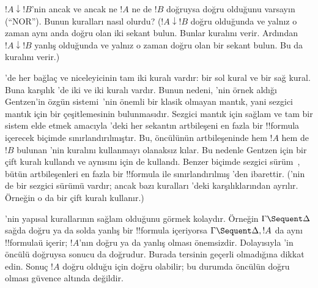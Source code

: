 \documentclass[../../../include/open-logic-section]{subfiles}
\begin{document}
\begin{prob}
$!A \downarrow !B$'nin ancak ve ancak ne $!A$ ne de $!B$ doğruysa doğru
olduğunu varsayın (``NOR''). Bunun  kuralları nasıl olurdu?
($!A \downarrow !B$ doğru olduğunda ve yalnız o zaman aynı anda doğru olan
iki sekant bulun. Bunlar \RightR{\downarrow} kuralını verir. Ardından $!A
\downarrow !B$ yanlış olduğunda ve yalnız o zaman doğru olan bir sekant
bulun. Bu da \LeftR{\downarrow} kuralını verir.)
\end{prob}

'de her bağlaç ve niceleyicinin tam iki kuralı vardır: bir sol
kural ve bir sağ kural. Buna karşılık 'de iki \LeftR{\land} ve
iki \RightR{\lor} kuralı vardır. Bunun nedeni, 'nin örnek aldığı
Gentzen'in özgün sistemi~'nin önemli bir klasik olmayan mantık,
yani sezgici mantık için bir  çeşitlemesinin bulunmasıdır. Sezgici
mantık için sağlam ve tam bir sistem elde etmek amacıyla 'deki her
sekantın artbileşeni en fazla bir !!{formula} içerecek biçimde
sınırlandırılmıştır. Bu, öncülünün artbileşeninde hem $!A$ hem de $!B$
bulunan 'nin \RightR{\lor} kuralını kullanmayı olanaksız kılar.
Bu nedenle Gentzen  için bir çift \RightR{\lor} kuralı kullandı ve
aynısını  için de kullandı. Benzer biçimde sezgici sürüm~,
bütün artbileşenleri en fazla bir !!{formula} ile sınırlandırılmış
'den ibarettir. ('nin de bir sezgici sürümü vardır; ancak
bazı kuralları 'deki karşılıklarından ayrılır. Örneğin o da bir
çift \RightR{\lor} kuralı kullanır.)

'nin yapısal kurallarının sağlam olduğunu görmek kolaydır. Örneğin
$\Gamma \Sequent \Delta$ sağda doğru ya da solda yanlış bir !!{formula}
içeriyorsa $\Gamma \Sequent \Delta, !A$ da aynı !!{formula}{}ü içerir; $!A$'nın
doğru ya da yanlış olması önemsizdir. Dolayısıyla \RightR{\Weakening}'in
öncülü doğruysa sonucu da doğrudur. Burada tersinin geçerli olmadığına
dikkat edin. Sonuç $!A$ doğru olduğu için doğru olabilir; bu durumda
öncülün doğru olması güvence altında değildir.
\end{document}
